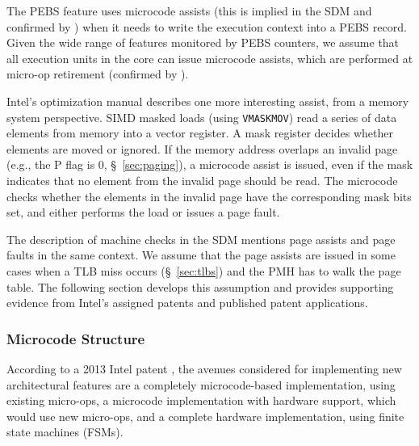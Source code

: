 The PEBS feature uses microcode assists (this is implied in the SDM and
confirmed by \cite{intel2014pebs}) when it needs to write the execution context
into a PEBS record. Given the wide range of features monitored by PEBS
counters, we assume that all execution units in the core can issue microcode
assists, which are performed at micro-op retirement (confirmed by
\cite{intel1997events}).


Intel's optimization manual describes one more interesting assist, from a
memory system perspective. SIMD masked loads (using \texttt{VMASKMOV}) read a
series of data elements from memory into a vector register. A mask register
decides whether elements are moved or ignored. If the memory address overlaps
an invalid page (e.g., the P flag is 0, \S~\ref{sec:paging}), a microcode
assist is issued, even if the mask indicates that no element from the invalid
page should be read. The microcode checks whether the elements in the invalid
page have the corresponding mask bits set, and either performs the load or
issues a page fault.


The description of machine checks in the SDM mentions page assists and page
faults in the same context. We assume that the page assists are issued in some
cases when a TLB miss occurs (\S~\ref{sec:tlbs}) and the PMH has to walk the
page table. The following section develops this assumption and provides
supporting evidence from Intel's assigned patents and published patent
applications.


\subsubsection{Microcode Structure}
\label{sec:microcode_structure}


According to a 2013 Intel patent \cite{intel2013scattergather}, the avenues
considered for implementing new architectural features are a completely
microcode-based implementation, using existing micro-ops, a microcode
implementation with hardware support, which would use new micro-ops, and a
complete hardware implementation, using finite state machines (FSMs).


